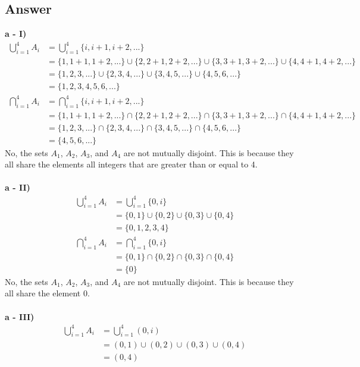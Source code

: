 \documentclass[12pt]{article}
\begin{document}
\subsection*{Answer}
\textbf{a - I)}
\begin{align*}
  \bigcup_{i=1}^{4}A_i &= \bigcup_{i=1}^{4}\{i, i+1, i+2, ...\} \\
  &= \{1, 1+1, 1+2, ...\} \cup \{2, 2+1, 2+2, ...\} \cup \{3, 3+1, 3+2, ...\} \cup \{4, 4+1, 4+2, ...\} \\
  &= \{1, 2, 3, ... \} \cup \{2, 3, 4, ... \} \cup \{3, 4, 5, ... \} \cup \{4, 5, 6, ... \} \\
  &= \{1, 2, 3, 4, 5, 6, ... \}
\end{align*}
\begin{align*}
  \bigcap_{i=1}^{4}A_i &= \bigcap_{i=1}^{4}\{i, i+1, i+2, ...\} \\
  &= \{1, 1+1, 1+2, ...\} \cap \{2, 2+1, 2+2, ...\} \cap \{3, 3+1, 3+2, ...\} \cap \{4, 4+1, 4+2, ...\} \\
  &= \{1, 2, 3, ... \} \cap \{2, 3, 4, ... \} \cap \{3, 4, 5, ... \} \cap \{4, 5, 6, ... \} \\
  &= \{4, 5, 6, ... \}
\end{align*}
No, the sets $A_1$, $A_2$, $A_3$, and $A_4$ are not mutually disjoint. This is because they all share the elements all integers that are greater than or equal to 4.
\\ \\
\textbf{a - II)}
\begin{align*}
  \bigcup_{i=1}^{4}A_i &= \bigcup_{i=1}^{4}\{0, i\} \\
  &= \{0, 1\} \cup \{0, 2\} \cup \{0, 3\} \cup \{0, 4\} \\
  &= \{0, 1, 2, 3, 4\}
\end{align*}
\begin{align*}
  \bigcap_{i=1}^{4}A_i &= \bigcap_{i=1}^{4}\{0, i\} \\
  &= \{0, 1\} \cap \{0, 2\} \cap \{0, 3\} \cap \{0, 4\} \\
  &= \{0\}
\end{align*}
No, the sets $A_1$, $A_2$, $A_3$, and $A_4$ are not mutually disjoint. This is because they all share the element 0.
\\ \\
\textbf{a - III)}
\begin{align*}
  \bigcup_{i=1}^{4}A_i &= \bigcup_{i=1}^{4}(0, i) \\
  &= (0, 1) \cup (0, 2) \cup (0, 3) \cup (0, 4) \\
  &= (0, 4)
\end{align*}
\end{document}
